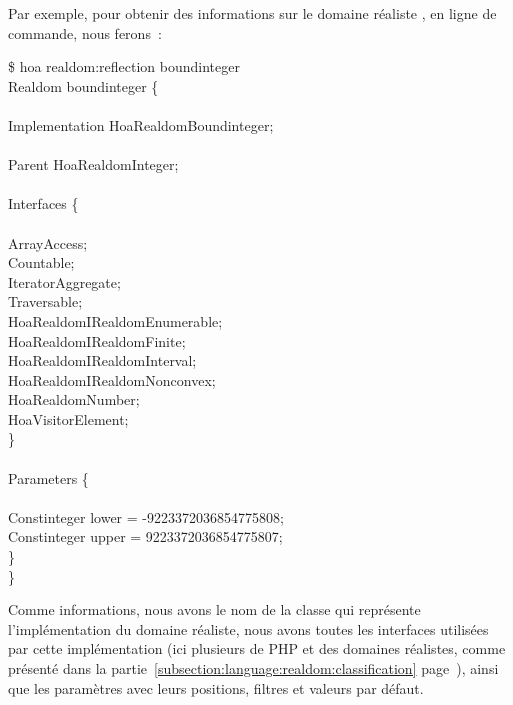 \begin{example}

Par exemple, pour obtenir des informations sur le domaine réaliste
, en ligne de commande, nous ferons~:
%
\begin{bigpre}
\$ hoa realdom:reflection boundinteger \\
Realdom boundinteger \{ \\
 \\
    Implementation Hoa\bslash{}Realdom\bslash{}Boundinteger; \\
 \\
    Parent Hoa\bslash{}Realdom\bslash{}Integer; \\
 \\
    Interfaces \{ \\
 \\
        ArrayAccess; \\
        Countable; \\
        IteratorAggregate; \\
        Traversable; \\
        Hoa\bslash{}Realdom\bslash{}IRealdom\bslash{}Enumerable; \\
        Hoa\bslash{}Realdom\bslash{}IRealdom\bslash{}Finite; \\
        Hoa\bslash{}Realdom\bslash{}IRealdom\bslash{}Interval; \\
        Hoa\bslash{}Realdom\bslash{}IRealdom\bslash{}Nonconvex; \\
        Hoa\bslash{}Realdom\bslash{}Number; \\
        Hoa\bslash{}Visitor\bslash{}Element; \\
    \} \\
 \\
    Parameters \{ \\
 \\
        [#0 optional] Constinteger lower = -9223372036854775808; \\
        [#1 optional] Constinteger upper = 9223372036854775807; \\
    \} \\
\}
\end{bigpre}
%
Comme informations, nous avons le nom de la classe qui représente
l'implémentation du domaine réaliste, nous avons toutes les interfaces utilisées
par cette implémentation (ici plusieurs de PHP et des domaines réalistes, comme
présenté dans la partie~\ref{subsection:language:realdom:classification}
page~\pageref{subsection:language:realdom:classification}), ainsi que les
paramètres avec leurs positions, filtres et valeurs par défaut.

\end{example}

